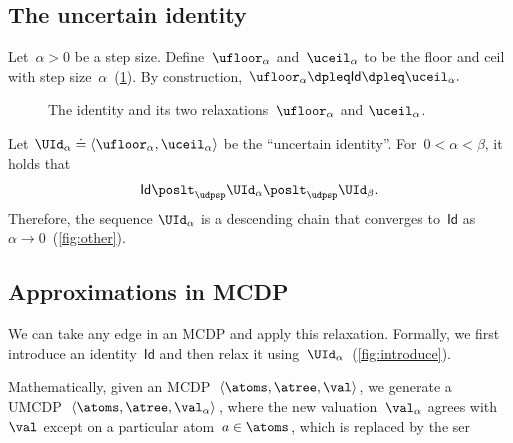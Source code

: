 \subsection{The uncertain identity}

Let~$\alpha>0$ be a step size. Define~$\ufloor_{\alpha}$ and~$\uceil_{\alpha}$
to be the floor and ceil with step size~$\alpha$~(\cref{fig:identity_approximation}).
By construction, $\ufloor_{\alpha}\dpleq\mathsf{Id}\dpleq\uceil_{\alpha}.$

\begin{figure}[h]
  \hfill{}\hfill{}

  \caption{\label{fig:identity_approximation}The identity and its two relaxations~$\ufloor_{\alpha}$
    and $\uceil_{\alpha}$.}
\end{figure}

Let $\UId_{\alpha}\doteq\left\langle \ufloor_{\alpha},\uceil_{\alpha}\right\rangle $
be the ``uncertain identity''. For~$0<\alpha<\beta$, it holds
that
\[
  \mathsf{Id}\poslt_{\udpsp}\UId_{\alpha}\poslt_{\udpsp}\UId_{\beta}.
\]
Therefore, the sequence $\UId_{\alpha}$ is a descending chain that
converges to~$\mathsf{Id}$ as~$\alpha\rightarrow0$~(\cref{fig:other}).


\subsection{Approximations in MCDP}

We can take any edge in an MCDP and apply this relaxation. Formally,
we first introduce an identity~$\mathsf{Id}$ and then relax it using~$\UId_{\alpha}$~(\cref{fig:introduce}).


Mathematically, given an MCDP~$\left\langle \atoms,\atree,\val\right\rangle $,
we generate a UMCDP~$\left\langle \atoms,\atree,\val_{\alpha}\right\rangle $,
where the new valuation~$\val_{\alpha}$ agrees with~$\val$ except
on a particular atom~$a\in\atoms$, which is replaced by the ser
